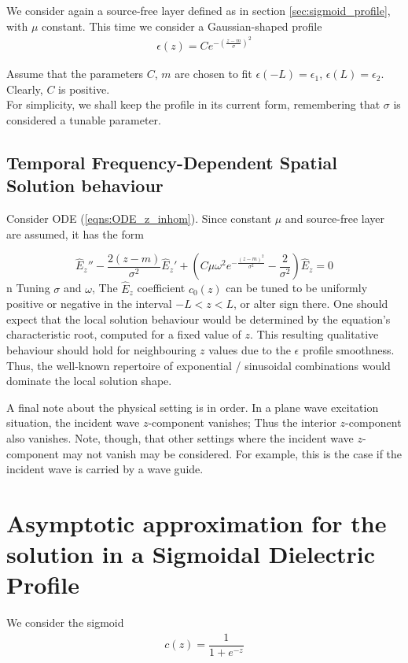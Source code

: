 \documentclass[twocolumn,secnumarabic,amssymb, nobibnotes, aps, prd]{revtex4-1}
\begin{document}
We consider again a source-free layer defined as in section \ref{sec:sigmoid_profile}, with $\mu$ constant. This time we consider a Gaussian-shaped profile
\begin{align}
\epsilon(z) = C e^{-(\frac{z-m}{\sigma})^2}
\label{eqns:Gauss_Profile}
\end{align}

Assume that the parameters $C$, $m$ are chosen to fit $\epsilon(-L)=\epsilon_1$, $\epsilon(L)=\epsilon_2$. Clearly, $C$ is positive.\\
For simplicity, we shall keep the profile in its current form, remembering that $\sigma$ is considered a tunable parameter. 

\subsection{Temporal Frequency-Dependent Spatial Solution behaviour}
Consider ODE (\ref{eqns:ODE_z_inhom}). Since constant $\mu$ and source-free layer are assumed, it has the form

\begin{equation}
 \hat{E}_z'' -\frac{2 (z-m)}{\sigma^2} \hat{E}_z' + \left( C \mu  \omega ^2 e^{-\frac{(z-m)^2}{\sigma
   ^2}}-\frac{2}{\sigma ^2}\right) \hat{E}_z = 0
\label{eqns:source_free_Gaussian_ODE_z}
\end{equation}n
Tuning $\sigma$ and $\omega$,  The $\hat{E}_z$ coefficient $c_0(z)$ can be tuned to be uniformly positive or negative in the interval $-L < z < L$, or alter sign there. One should expect that the local solution behaviour would be determined by the equation's characteristic root, computed for a fixed value of $z$. This resulting qualitative behaviour should hold for neighbouring $z$ values due to the $\epsilon$ profile smoothness. Thus, the well-known repertoire of exponential / sinusoidal combinations would dominate the local solution shape.  

A final note about the physical setting is in order. In a plane wave excitation situation, the incident wave $z$-component vanishes; Thus the interior $z$-component also vanishes. Note, though, that other settings where the incident wave $z$-component may not vanish may be considered. For example, this is the case if the incident wave is carried by a wave guide.\\       



\section{Asymptotic approximation for the solution in a Sigmoidal Dielectric Profile}
We consider the sigmoid
\begin{align}
\label{eqns:Sigmoid}
c(z) = \dfrac{1}{1+e^{-z}}
\end{align}
\end{document}
